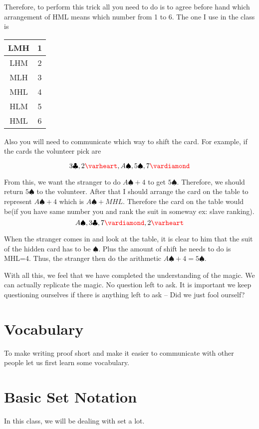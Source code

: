 \documentclass[a4paper, 12pt]{article}
\renewcommand{\heartsuit}{\textcolor{red}{\varheart}}
\renewcommand{\diamondsuit}{\textcolor{red}{\vardiamond}}
\theoremstyle{examplestyle}
\begin{document}
\begin{multicols}{2}
Therefore, to perform this trick all you need to do is to agree before hand which arrangement of HML means which number from 1 to 6. The one I use in the class is
\begin{center}
\begin{tabular}{c|c}
	\hline\hline LMH & 1  \\ 
	\hline LHM & 2 \\ 
	\hline MLH & 3 \\ 
	\hline MHL & 4 \\ 
	\hline HLM & 5 \\ 
	\hline HML & 6 \\
	\hline \hline
\end{tabular} 
\end{center}


Also you will need to communicate which way to shift the card. For example, if the cards the volunteer pick are

\[
	3\clubsuit, 2\heartsuit, A \spadesuit, 5\spadesuit, 7 \diamondsuit
\]

From this, we want the stranger to do $A\spadesuit + 4$ to get $5\spadesuit$. Therefore, we should return $5\spadesuit$ to the volunteer. After that I should arrange the card on the table to represent $A\spadesuit + 4$ which is $A\spadesuit + MHL$. Therefore the card on the table would be(if you have same number you and rank the suit in someway ex: slave ranking).
\[
	A\spadesuit, 3\clubsuit, 7\diamondsuit, 2\heartsuit
\]

When the stranger comes in and look at the table, it is clear to him that the suit of the hidden card has to be $\spadesuit$. Plus the amount of shift he needs to do is MHL=4. Thus, the stranger then do the arithmetic $A\spadesuit + 4 = 5\spadesuit$.

With all this, we feel that we have completed the understanding of the magic. We can actually replicate the magic. No question left to ask. It is important we keep questioning ourselves if there is anything left to ask -- Did we just fool ourself?

\section*{Vocabulary}

To make writing proof short and make it easier to communicate with other people let us first learn some vocabulary.

\section*{Basic Set Notation}
In this class, we will be dealing with set a lot.


\end{multicols}
\end{document}
